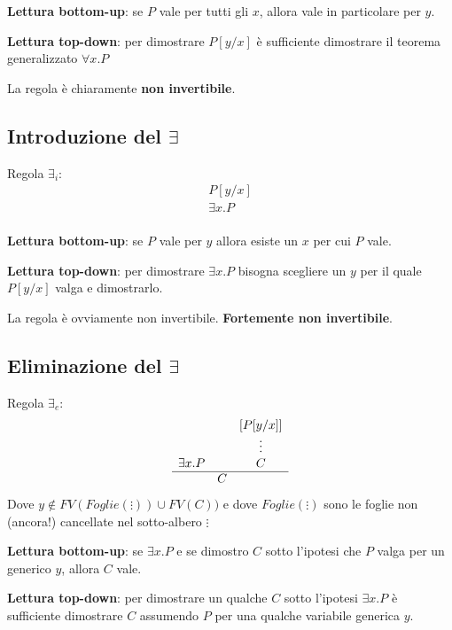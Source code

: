 \documentclass[
  a4paper,
]{article}
\begin{document}
\textbf{Lettura bottom-up}: se \(P\) vale per tutti gli \(x\), allora
vale in particolare per \(y\).

\textbf{Lettura top-down}: per dimostrare \(P[y/x]\) è sufficiente
dimostrare il teorema generalizzato \(\forall x.P\)

La regola è chiaramente \textbf{non invertibile}.

\hypertarget{introduzione-del-exists}{%
\subsection{\texorpdfstring{Introduzione del
\(\exists\)}{Introduzione del \textbackslash exists}}\label{introduzione-del-exists}}

Regola \(\exists_i\): \[
\begin{matrix} 
P[y/x] \\
\hline 
\exists x.P \\
\end{matrix}
\]

\textbf{Lettura bottom-up}: se \(P\) vale per \(y\) allora esiste un
\(x\) per cui \(P\) vale.

\textbf{Lettura top-down}: per dimostrare \(\exists x.P\) bisogna
scegliere un \(y\) per il quale \(P[y/x]\) valga e dimostrarlo.

La regola è ovviamente non invertibile. \textbf{Fortemente non
invertibile}.

\hypertarget{eliminazione-del-exists}{%
\subsection{\texorpdfstring{Eliminazione del
\(\exists\)}{Eliminazione del \textbackslash exists}}\label{eliminazione-del-exists}}

Regola \(\exists_e\): \[
\begin{matrix} 
&&[P[y/x]] \\
&&\vdots \\
\exists x.P && C \\
\hline
& C 
\end{matrix}
\] Dove \(y \not \in FV(Foglie(\vdots)) \cup FV(C))\) e dove
\(Foglie(\vdots)\) sono le foglie non (ancora!) cancellate nel
sotto-albero \(\vdots\)

\textbf{Lettura bottom-up}: se \(\exists x.P\) e se dimostro \(C\) sotto
l'ipotesi che \(P\) valga per un generico \(y\), allora \(C\) vale.

\textbf{Lettura top-down}: per dimostrare un qualche \(C\) sotto
l'ipotesi \(\exists x.P\) è sufficiente dimostrare \(C\) assumendo \(P\)
per una qualche variabile generica \(y\).
\end{document}
